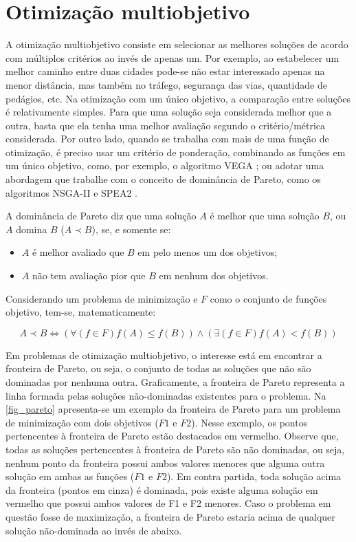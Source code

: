 \chapter[Otimização multiobjetivo]{Otimização multiobjetivo}

A otimização multiobjetivo consiste em selecionar as melhores soluções de acordo com múltiplos critérios ao invés de apenas um. Por exemplo, ao estabelecer um melhor caminho entre duas cidades pode-se não estar interessado apenas na menor distância, mas também no tráfego, segurança das vias, quantidade de pedágios, etc. Na otimização com um único objetivo, a comparação entre soluções é relativamente simples. Para que uma solução seja considerada melhor que a outra, basta que ela tenha uma melhor avaliação segundo o critério/métrica considerada. Por outro lado, quando se trabalha com mais de uma função de otimização, é preciso usar um critério de ponderação, combinando as funções em um único objetivo, como, por exemplo, o algoritmo VEGA \cite{Schaffer1985}; ou adotar uma abordagem que trabalhe com o conceito de dominância de Pareto, como os algoritmos NSGA-II \cite{Deb2002} e SPEA2 \cite{Zitzler2002}.

A dominância de Pareto diz que uma solução $A$ é melhor que uma solução $B$, ou $A$ domina $B$ ($A \prec B$), se, e somente se:

\begin{itemize}  
	\item $A$ é melhor avaliado que $B$ em pelo menos um dos objetivos;
	\item $A$ não tem avaliação pior que $B$ em nenhum dos objetivos.
\end{itemize}

Considerando um problema de minimização e $F$ como o conjunto de funções objetivo, tem-se, matematicamente:

\[A \prec B \Leftrightarrow (\forall(f \in F) f(A) \leq f(B)) \land (\exists (f \in F) f(A) < f(B))\]

Em problemas de otimização multiobjetivo, o interesse está em encontrar a fronteira de Pareto, ou seja, o conjunto de todas as soluções que não são dominadas por nenhuma outra. Graficamente, a fronteira de Pareto representa a linha formada pelas soluções não-dominadas existentes para o problema. Na \autoref{fig_pareto} apresenta-se um exemplo da fronteira de Pareto para um problema de minimização com dois objetivos ($F1$ e $F2$). Nesse exemplo, os pontos pertencentes à fronteira de Pareto estão destacados em vermelho. Observe que, todas as soluções pertencentes à fronteira de Pareto são não dominadas, ou seja, nenhum ponto da fronteira possui ambos valores menores que alguma outra solução em ambas as funções ($F1$ e $F2$). Em contra partida, toda solução acima da fronteira (pontos em cinza) é dominada, pois existe alguma solução em vermelho que possui ambos valores de F1 e F2 menores. Caso o problema em questão fosse de maximização, a fronteira de Pareto estaria acima de qualquer solução não-dominada ao invés de abaixo.

